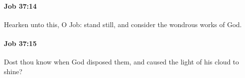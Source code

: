 		\paragraph{Job 37:14} %
			\label{JOB-37-14}

			Hearken unto this, O Job: stand still, and consider the wondrous works of God.


		\paragraph{Job 37:15} %
			\label{JOB-37-15}

			Dost thou know when God disposed them, and caused the light of his cloud to shine?


